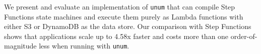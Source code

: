 \documentclass[letterpaper,twocolumn,10pt]{article}
\newcommand{\name}{\texttt{unum}}
\begin{document}
We present and evaluate an implementation of \name{} that can compile Step
Functions state machines and execute them purely as Lambda functions with
either S3 or DynamoDB as the data store. Our comparison with Step Functions
shows that applications scale up to 4.58x faster and costs more than one
order-of-magnitude less when running with \name{}. 





%


% 


\vspace{5in} %




\end{document}
